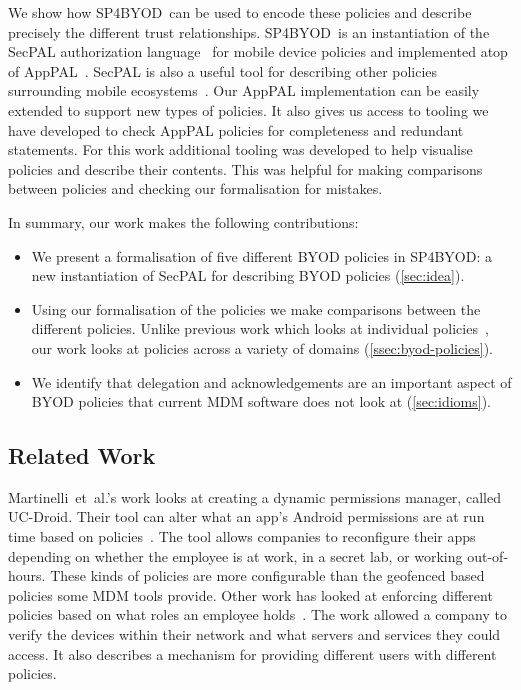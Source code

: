 \documentclass{llncs}
\makeatletter
\newcommand{\etal}{et~al.\@}
\newcommand{\AppPAL}[0]{SP4BYOD}
\makeatother
\begin{document}
We show how \AppPAL~can be used to encode these policies and describe precisely the different trust relationships.
\AppPAL~is an instantiation of the SecPAL authorization language~\cite{becker_secpal:_2010} for mobile device policies and implemented atop of AppPAL~\cite{hallett_apppal_2016}.
SecPAL is also a useful tool for describing other policies surrounding mobile ecosystems~\cite{hallett_specifying_2016}.
Our AppPAL implementation can be easily extended to support new types of policies.
It also gives us access to tooling we have developed to check AppPAL policies for completeness and redundant statements.
For this work additional tooling was developed to help visualise policies and describe their contents.
This was helpful for making comparisons between policies and checking our formalisation for mistakes. 


In summary, our work makes the following contributions:
\begin{itemize}[topsep=0pt]
  \item We present a formalisation of five different BYOD policies in \AppPAL: a new instantiation of SecPAL for describing BYOD policies (\autoref{sec:idea}).
  \item Using our formalisation of the policies we make comparisons between the different policies. 
    Unlike previous work which looks at individual policies~\cite{armando_developing_2016}, our work looks at policies across a variety of domains (\autoref{ssec:byod-policies}).
  \item We identify that delegation and acknowledgements are an important aspect of BYOD policies that current MDM software does not look at (\autoref{sec:idioms}).
\end{itemize}

\subsection{Related Work}
\label{sec:related}

Martinelli~\etal{}'s work looks at creating a dynamic permissions manager, called UC-Droid.
Their tool can alter what an app's Android permissions are at run time based on policies~\cite{martinelli_enhancing_2016}.
The tool allows companies to reconfigure their apps depending on whether the employee is at work, in a secret lab, or working out-of-hours.
These kinds of policies are more configurable than the geofenced based policies some \ac{MDM} tools provide.
Other work has looked at enforcing different policies based on what roles an employee holds~\cite{costantino_towards_2013}.
The work allowed a company to verify the devices within their network and what servers and services they could access.
It also describes a mechanism for providing different users with different policies.
\end{document}
